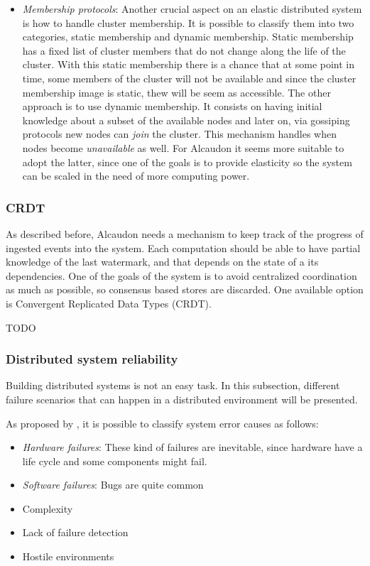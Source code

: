 \begin{itemize}
\item \textit{Membership protocols}: Another crucial aspect on an elastic
  distributed system is how to handle cluster membership. It is possible to
  classify them into two categories, static membership and dynamic membership.
  Static membership has a fixed list of cluster members that do not change along
  the life of the cluster. With this static membership there is a chance that at
  some point in time, some members of the cluster will not be available and
  since the cluster membership image is static, thew will be seem as accessible.
  The other approach is to use dynamic membership. It consists on having initial
  knowledge about a subset of the available nodes and later on, via gossiping
  protocols\cite{gossip} new nodes can \textit{join} the cluster. This mechanism
  handles when nodes become \textit{unavailable} as well. For Alcaudon it seems
  more suitable to adopt the latter, since one of the goals is to provide
  elasticity so the system can be scaled in the need of more computing power.
\end{itemize}

\subsubsection{CRDT}

As described before, Alcaudon needs a mechanism to keep track of the progress of
ingested events into the system. Each computation should be able to have partial
knowledge of the last watermark, and that depends on the state of a its
dependencies. One of the goals of the system is to avoid centralized
coordination as much as possible, so consensus based stores are discarded.
One available option is Convergent Replicated Data Types (CRDT)\cite{crdt}.

TODO

\subsubsection{Distributed system reliability}

Building distributed systems is not an easy task. In this subsection, different
failure scenarios that can happen in a distributed environment will be presented.

As proposed by \cite{GuideReliable}, it is possible to classify system error
causes as follows:
\begin{itemize}
\item \textit{Hardware failures}: These kind of failures are inevitable, since
  hardware have a life cycle and some components might fail.
\item \textit{Software failures}: Bugs are quite common
\item Complexity
\item Lack of failure detection
\item Hostile environments
\end{itemize}


